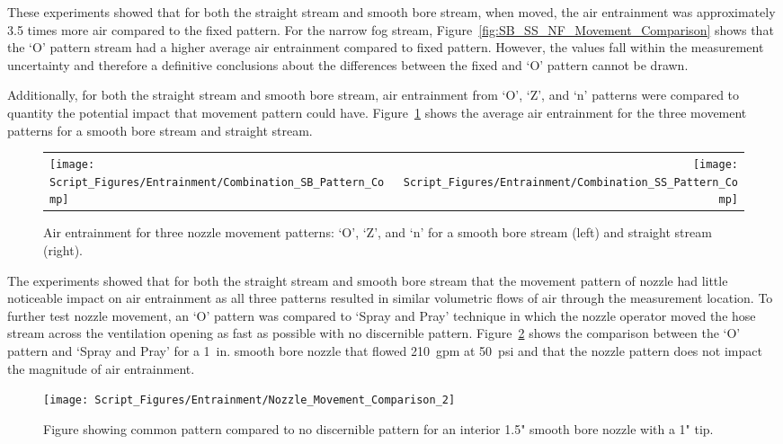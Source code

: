 \documentclass[12pt,oneside]{book}
\begin{document}
These experiments showed that for both the straight stream and smooth bore stream, when moved, the air entrainment was approximately 3.5 times more air compared to the fixed pattern. For the narrow fog stream, Figure~\ref{fig:SB_SS_NF_Movement_Comparison} shows that the `O' pattern stream had a higher average air entrainment compared to fixed pattern. However, the values fall within the measurement uncertainty and therefore a definitive conclusions about the differences between the fixed and `O' pattern cannot be drawn. 

Additionally, for both the straight stream and smooth bore stream, air entrainment from `O', `Z', and `n' patterns were compared to quantity the potential impact that movement pattern could have. Figure~\ref{fig:SS_SB_Movement_Comparison} shows the average air entrainment for the three movement patterns for a smooth bore stream and straight stream.

\begin{figure}[!ht]
\begin{tabular*}{\textwidth}{lr}
\texttt{[image: Script\_Figures/Entrainment/Combination\_SB\_Pattern\_Comp]} &
\texttt{[image: Script\_Figures/Entrainment/Combination\_SS\_Pattern\_Comp]} \\
\end{tabular*}
\caption[Air Entrainment Comparison of Movement Patterns]{Air entrainment for three nozzle movement patterns: `O', `Z', and `n' for a smooth bore stream (left) and straight stream (right).}
\label{fig:SS_SB_Movement_Comparison}
\end{figure}

The experiments showed that for both the straight stream and smooth bore stream that the movement pattern of nozzle had little noticeable impact on air entrainment as all three patterns resulted in similar volumetric flows of air through the measurement location. To further test nozzle movement, an `O' pattern was compared to `Spray and Pray' technique in which the nozzle operator moved the hose stream across the ventilation opening as fast as possible with no discernible pattern. Figure~\ref{fig:Nozzle_Movement_PatterntoNoPattern_Comparison} shows the comparison between the `O' pattern and `Spray and Pray' for a 1~in. smooth bore nozzle that flowed 210~gpm at 50~psi and that the nozzle pattern does not impact the magnitude of air entrainment. 

\begin{figure}[!ht]
\centering
\texttt{[image: Script\_Figures/Entrainment/Nozzle\_Movement\_Comparison\_2]}
\caption[Air Entrainment Comparison of `O' Pattern Versus `Spray and Pray']{Figure showing common pattern compared to no discernible pattern for an interior 1.5" smooth bore nozzle with a 1" tip.}
\label{fig:Nozzle_Movement_PatterntoNoPattern_Comparison}
\end{figure}
\end{document}
